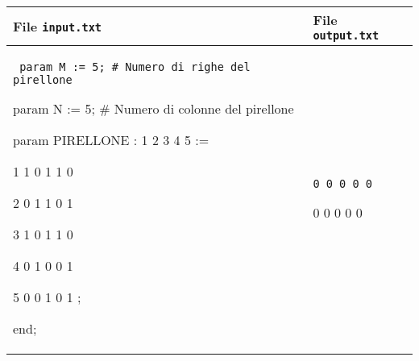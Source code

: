 \documentclass[a4paper,11pt]{article}
\newcommand{\file}[1]{\texttt{#1}}
\newcommand{\esempio}[2]{
\noindent\begin{minipage}{\textwidth}
\begin{tabular}{|p{11cm}|p{5cm}|}
	\hline
	\textbf{File \file{input.txt}} & \textbf{File \file{output.txt}}\\
	\hline
	\tt \small #1 &
	\tt \small #2 \\
	\hline
\end{tabular}
\end{minipage}
}
\begin{document}
\esempio{
param M := 5;  \# Numero di righe del pirellone

param N := 5;  \# Numero di colonne del pirellone

param PIRELLONE :  1 2 3 4 5 :=

              1    1 0 1 1 0

              2    0 1 1 0 1

              3    1 0 1 1 0 

              4    0 1 0 0 1

              5    0 0 1 0 1 ;

end;}{0 0 0 0 0

0 0 0 0 0}
\end{document}
